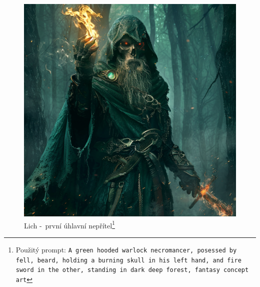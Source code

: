 \begin{figure}[h]
  \begin{minipage}{\textwidth}
    \centering
    \includegraphics[width=\textwidth]{resources/figures/undeadSkeletNecro.png}
    \caption[Lich -~první úhlavní nepřítel]{Lich -~první úhlavní nepřítel\footnote[4]{Použitý prompt: \texttt{A~green hooded warlock necromancer, posessed by fell, beard, holding a~burning skull in his left hand, and fire sword in the other, standing in dark deep forest, fantasy concept art}}}
    \label{fig:undeadSkeletNecro}
  \end{minipage}
\end{figure}

